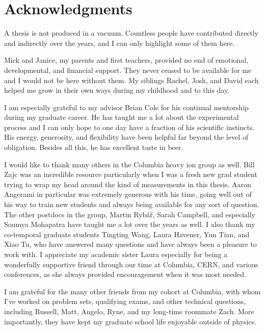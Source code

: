 \chapter{Acknowledgments} %

A thesis is not produced in a vacuum.
Countless people have contributed directly and indirectly over the years, and I can only highlight some of them here.

Mick and Janice, my parents and first teachers, provided no end of emotional, developmental, and financial support.
They never ceased to be available for me and I would not be here without them.
My siblings Rachel, Josh, and David each helped me grow in their own ways during my childhood and to this day.

I am especially grateful to my advisor Brian Cole for his continual mentorship during my graduate career.
He has taught me a lot about the experimental process and I can only hope to one day have a fraction of his scientific instincts.
His energy, generosity, and flexibility have been helpful far beyond the level of obligation.
Besides all this, he has excellent taste in beer.

I would like to thank many others in the Columbia heavy ion group as well.
Bill Zajc was an incredible resource particularly when I was a fresh new grad student trying to wrap my head around the kind of measurements in this thesis.
Aaron Angerami in particular was extremely generous with his time, going well out of his way to train new students and always being available for any sort of question.
The other postdocs in the group, Martin Ryb\'a\v{r}, Sarah Campbell, and especially Soumya Mohapatra have taught me a lot over the years as well.
I also thank my co-temporal graduate students Tingting Wang, Laura Havener, Yun Tian, and Xiao Tu, who have answered many questions and have always been a pleasure to work with.
I appreciate my academic sister Laura especially for being a wonderfully supportive friend through our time at Columbia, CERN, and various conferences, as she always provided encouragement when it was most needed.

I am grateful for the many other friends from my cohort at Columbia, with whom I've worked on problem sets, qualifying exams, and other technical questions, including Russell, Matt, Angelo, Ryne, and my long-time roommate Zach.
More importantly, they have kept my graduate school life enjoyable outside of physics.

